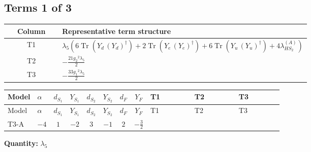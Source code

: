 \documentclass[8pt]{article}
\begin{document}
\begin{landscape}
\subsection*{Terms 1 of 3}
\begin{center}
\begin{tabular}{@{}c >{\raggedright\arraybackslash}p{0.82\linewidth}@{}}
\toprule
Column & Representative term structure \\
\midrule
T1 & \(\displaystyle {\lambda_5} (6 \operatorname{Tr}\!\left({Y_d}\,\left({Y_d}\right)^{\dagger}\right)+2 \operatorname{Tr}\!\left({Y_e}\,\left({Y_e}\right)^{\dagger}\right)+6 \operatorname{Tr}\!\left({Y_u}\,\left({Y_u}\right)^{\dagger}\right)+4 {\lambda_{HS_2}^{(A)}})\) \\
\midrule
T2 & \(\displaystyle -\frac{21 {g_2}^2 {\lambda_5}}{2}\) \\
\midrule
T3 & \(\displaystyle -\frac{33 {g_1}^2 {\lambda_5}}{2}\) \\
\midrule
\bottomrule
\end{tabular}
\end{center}
\smallskip
\tiny
\begin{longtable}{@{}llcccccc >{\raggedright\arraybackslash}p{0.21\linewidth} >{\raggedright\arraybackslash}p{0.21\linewidth} >{\raggedright\arraybackslash}p{0.21\linewidth}@{}}
\toprule
Model & $\alpha$ & $d_{S_1}$ & $Y_{S_1}$ & $d_{S_2}$ & $Y_{S_2}$ & $d_F$ & $Y_F$ & T1 & T2 & T3 \\
\midrule
\endfirsthead
\toprule
Model & $\alpha$ & $d_{S_1}$ & $Y_{S_1}$ & $d_{S_2}$ & $Y_{S_2}$ & $d_F$ & $Y_F$ & T1 & T2 & T3 \\
\midrule
\endhead
T3-A & $-4$ & $1$ & $-2$ & $3$ & $-1$ & $2$ & $-\frac{3}{2}$ & \scriptsize\adjustbox{max width=\linewidth}{$\begin{gathered} {\lambda_5} (6 \operatorname{Tr}\!\left({Y_d}\,\left({Y_d}\right)^{\dagger}\right)+2 \operatorname{Tr}\!\left({Y_e}\,\left({Y_e}\right)^{\dagger}\right)+6 \operatorname{Tr}\!\left({Y_u}\,\left({Y_u}\right)^{\dagger}\right)+4 {\lambda_{HS_2}^{(A)}})\end{gathered}$} & \scriptsize\adjustbox{max width=\linewidth}{$\begin{gathered} -\frac{21 {g_2}^2 {\lambda_5}}{2}\end{gathered}$} & \scriptsize\adjustbox{max width=\linewidth}{$\begin{gathered} -\frac{33 {g_1}^2 {\lambda_5}}{2}\end{gathered}$} \\
\midrule
\bottomrule
\end{longtable}
\clearpage
\noindent\textbf{Quantity: }$\lambda_5$\par\smallskip

\end{landscape}
\end{document}
